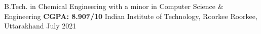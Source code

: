 \begin{cventries}
  \cventryeducationlast
    {B.Tech. in Chemical Engineering with a minor in Computer Science \& Engineering \quad \textbf{CGPA: 8.907/10}}
    {Indian Institute of Technology, Roorkee}
    {Roorkee, Uttarakhand}
    {July 2021}
    

\end{cventries}

